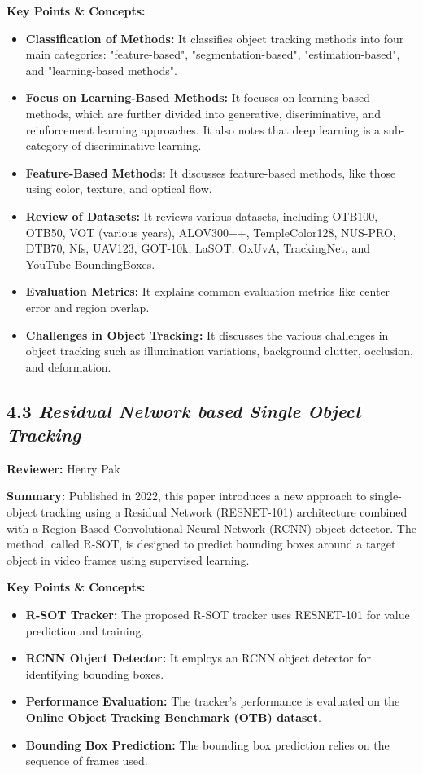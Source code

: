 \documentclass{article}
\begin{document}
\textbf{Key Points \& Concepts:}
\begin{itemize}
  \item \textbf{Classification of Methods:} It classifies object tracking methods into four main categories: "feature-based", "segmentation-based", "estimation-based", and "learning-based methods".
  \item \textbf{Focus on Learning-Based Methods:} It focuses on learning-based methods, which are further divided into generative, discriminative, and reinforcement learning approaches. It also notes that deep learning is a sub-category of discriminative learning.
  \item \textbf{Feature-Based Methods:} It discusses feature-based methods, like those using color, texture, and optical flow.
  \item \textbf{Review of Datasets:} It reviews various datasets, including OTB100, OTB50, VOT (various years), ALOV300++, TempleColor128, NUS-PRO, DTB70, Nfs, UAV123, GOT-10k, LaSOT, OxUvA, TrackingNet, and YouTube-BoundingBoxes.
  \item \textbf{Evaluation Metrics:} It explains common evaluation metrics like center error and region overlap.
  \item \textbf{Challenges in Object Tracking:} It discusses the various challenges in object tracking such as illumination variations, background clutter, occlusion, and deformation.
\end{itemize}
\subsection*{4.3 \textit{Residual Network based Single Object Tracking}}

\hspace*{\parindent}\textbf{Reviewer:} Henry Pak

\vspace{0.3cm}

\textbf{Summary:} Published in 2022, this paper introduces a new approach to single-object tracking using a Residual Network (RESNET-101) architecture combined with a Region Based Convolutional Neural Network (RCNN) object detector. The method, called R-SOT, is designed to predict bounding boxes around a target object in video frames using supervised learning.

\vspace{0.3cm}

\textbf{Key Points \& Concepts:}
\begin{itemize}
  \item \textbf{R-SOT Tracker:} The proposed R-SOT tracker uses RESNET-101 for value prediction and training.
  \item \textbf{RCNN Object Detector:} It employs an RCNN object detector for identifying bounding boxes.
  \item \textbf{Performance Evaluation:} The tracker's performance is evaluated on the \textbf{Online Object Tracking Benchmark (OTB) dataset}.
  \item \textbf{Bounding Box Prediction:} The bounding box prediction relies on the sequence of frames used.
\end{itemize}
\end{document}
